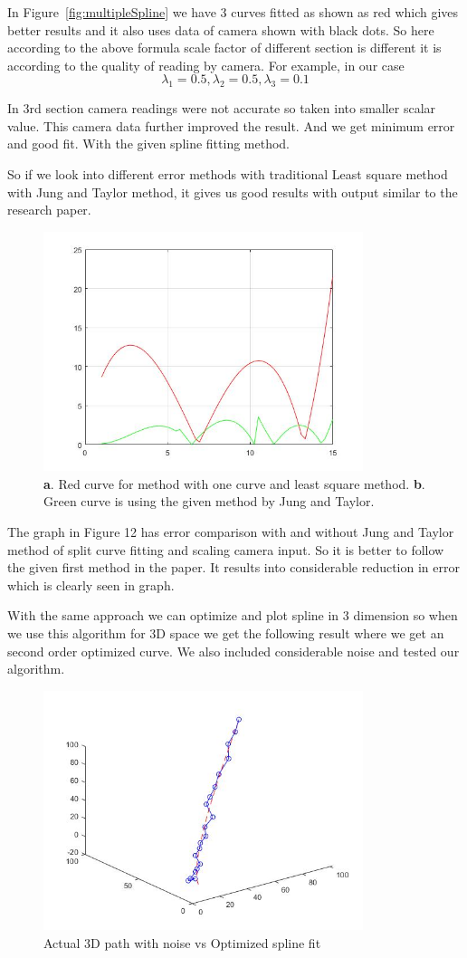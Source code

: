 In Figure~\ref{fig:multipleSpline} we have 3 curves fitted as shown as red which gives better results and it also uses data of camera shown with black dots. So here according to the above formula scale factor of different section is different it is according to the quality of reading by camera.
For example, in our case 
\begin{equation}
\lambda_1=0.5 ,\lambda_2=0.5 ,\lambda_3=0.1
\end{equation}

In 3rd section camera readings were not accurate so taken into smaller scalar value. This camera data further improved the result. And we get minimum error and good fit. With the given spline fitting method.

So if we look into different error methods with traditional Least square method with Jung and Taylor method, it gives us good results with output similar to the research paper.

\begin{figure}[!htb]
\includegraphics[width=\textwidth,height=7cm,keepaspectratio]{./figures/ErrorC.jpg}
\caption{\textbf{a}. Red curve for method with one curve and least square method. 
\textbf{b}. Green curve is using the given method by Jung and Taylor.}
\label{fig:errorc1}
\end{figure}

The graph in Figure 12 has error comparison with and without Jung and Taylor method of split curve fitting and scaling camera input.
So it is better to follow the given first method in the paper. It results into considerable reduction in error which is clearly seen in graph.

With the same approach we can optimize and plot spline in 3 dimension so when we use this algorithm for 3D space we get the following result where we get an second order optimized curve. We also included considerable noise and tested our algorithm.
  
\begin{figure}[H]
\includegraphics[width=\textwidth,height=7cm,keepaspectratio]{./figures/3DCurve.jpg}
\caption{Actual 3D path with noise vs Optimized spline fit}
\label{fig:errorc1}
\end{figure}